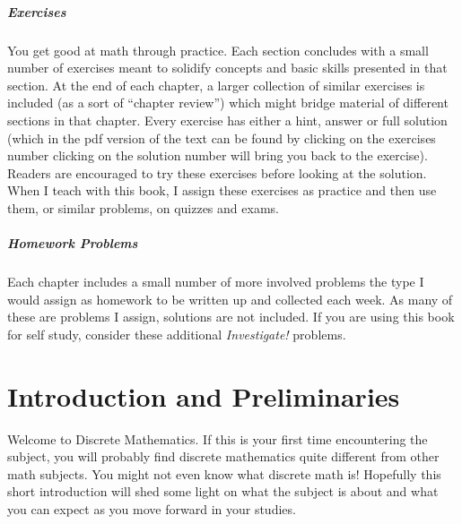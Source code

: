 \documentclass[10pt,]{book}
\theoremstyle{plain}
\theoremstyle{definition}
\theoremstyle{definition}
\theoremstyle{definition}
\numberwithin{equation}{section}
\begin{document}
\paragraph[Exercises]{Exercises}\hypertarget{paragraphs-4}{}

  You get good at math through practice. Each section concludes with a small number of exercises meant to solidify concepts and basic skills presented in that section. At the end of each chapter, a larger collection of similar exercises is included (as a sort of ``chapter review'') which might bridge material of different sections in that chapter. Every exercise has either a hint, answer or full solution (which in the pdf version of the text can be found by clicking on the exercises number \textendash{} clicking on the solution number will bring you back to the exercise). Readers are encouraged to try these exercises before looking at the solution. When I teach with this book, I assign these exercises as practice and then use them, or similar problems, on quizzes and exams.
\typeout{************************************************}
\typeout{************************************************}
\paragraph[Homework Problems]{Homework Problems}\hypertarget{paragraphs-5}{}

       Each chapter includes a small number of more involved problems \textendash{} the type I would assign as homework to be written up and collected each week. As many of these are problems I assign, solutions are not included. If you are using this book for self study, consider these additional \emph{Investigate!} problems.
\setcounter{tocdepth}{3}
\renewcommand*\contentsname{Contents}
\tableofcontents
\mainmatter
\typeout{************************************************}
\typeout{************************************************}
\chapter[Introduction and Preliminaries]{Introduction and Preliminaries}\label{ch_intro}
\typeout{************************************************}
\typeout{************************************************}

      Welcome to Discrete Mathematics. If this is your first time encountering the subject, you will probably find discrete mathematics quite different from other math subjects. You might not even know what discrete math is! Hopefully this short introduction
      will shed some light on what the subject is about and what you can expect as you move forward in your studies.
\typeout{************************************************}
\typeout{************************************************}
\end{document}
